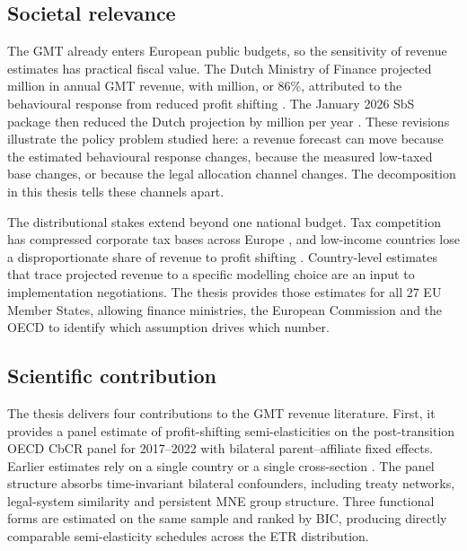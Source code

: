 \documentclass[11pt,a4paper]{article}
\newcommand{\EUR}{\texteuro}
\begin{document}
\subsection{Societal relevance}\label{sec:relevance}

The GMT already enters European public budgets, so the sensitivity of revenue estimates has practical fiscal value. The Dutch Ministry of Finance projected \EUR466 million in annual GMT revenue, with \EUR402 million, or 86\%, attributed to the behavioural response from reduced profit shifting \citep{36369_3}. The January 2026 SbS package then reduced the Dutch projection by \EUR122 million per year \citep{1028}. These revisions illustrate the policy problem studied here: a revenue forecast can move because the estimated behavioural response changes, because the measured low-taxed base changes, or because the legal allocation channel changes. The decomposition in this thesis tells these channels apart.

The distributional stakes extend beyond one national budget. Tax competition has compressed corporate tax bases across Europe \citep{cassee2019}, and low-income countries lose a disproportionate share of revenue to profit shifting \citep{cobham2018,garcia-bernardo2024}. Country-level estimates that trace projected revenue to a specific modelling choice are an input to implementation negotiations. The thesis provides those estimates for all 27 EU Member States, allowing finance ministries, the European Commission and the OECD to identify which assumption drives which number.

\subsection{Scientific contribution}\label{sec:contribution}

The thesis delivers four contributions to the GMT revenue literature. First, it provides a panel estimate of profit-shifting semi-elasticities on the post-transition OECD CbCR panel for 2017--2022 with bilateral parent--affiliate fixed effects. Earlier estimates rely on a single country \citep{dowd2017,boukal2026} or a single cross-section \citep{garcia-bernardo2024}. The panel structure absorbs time-invariant bilateral confounders, including treaty networks, legal-system similarity and persistent MNE group structure. Three functional forms are estimated on the same sample and ranked by BIC, producing directly comparable semi-elasticity schedules across the ETR distribution.
\end{document}
